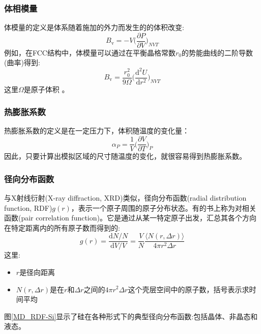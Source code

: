 \subsubsection{体相模量}
体模量的定义是体系随着施加的外力而发生的的体积改变:
\begin{equation}
	B_{\mathrm{v}}=-V\bigg(\dfrac{\partial P}{\partial V}\bigg)_{NVT}
	\label{eq:Bulk-modulus}
\end{equation}
例如，在\textrm{FCC}结构中，体模量可以通过在平衡晶格常数$r_0$的势能曲线的二阶导数(曲率)得到:
\begin{equation}
	B_{\mathrm{v}}=\dfrac{r_0^2}{9\Omega}\bigg(\dfrac{\mathrm{d}^2U}{\mathrm{d}r^2}\bigg)_{NVT}
	\label{eq:Bulk-modulus-2}
\end{equation}
这里$\Omega$是原子体积%
。
\subsubsection{热膨胀系数}
热膨胀系数的定义是在一定压力下，体积随温度的变化量：
\begin{equation}
	\alpha_P=\dfrac1V\bigg(\dfrac{\partial V}{\partial T}\bigg)_P
	\label{eq:expansion-coefficient}
\end{equation}
因此，只要计算出模拟区域的尺寸随温度的变化，就很容易得到热膨胀系数。
\subsubsection{径向分布函数}
与\textrm{X}射线衍射\textrm{(X-ray diffraction, XRD)}类似，径向分布函数\textrm{(radial distribution function, RDF)}$g(r)$，表示一个原子周围的原子分布状态。有的书上称为对相关函数\textrm{(pair correlation function)}。它是通过从某一特定原子出发，汇总其各个方向在特定距离内的所有原子数而得到的:
\begin{equation}
	g(r)=\dfrac{\mathrm{d}N/N}{\mathrm{d}V/V}=\dfrac{V}{N}\dfrac{\langle N(r,\Delta r)\rangle}{4\pi r^2\Delta r}
	\label{eq:MD_RDF}
\end{equation}
这里:
\begin{itemize}
	\item $r$是径向距离
	\item $N(r,\Delta r)$是在$r$和$\Delta r$之间的$4\pi r^2\Delta r$这个壳层空间中的原子数，括号表示求时间平均
\end{itemize}
图\ref{MD_RDF-Si}显示了硅在各种形式下的典型径向分布函数:包括晶体、非晶态和液态。

